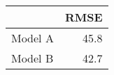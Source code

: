 
\begin{tabular}{l|r}
\hline
  & RMSE\\
\hline
Model A & 45.8\\
\hline
Model B & 42.7\\
\hline
\end{tabular}